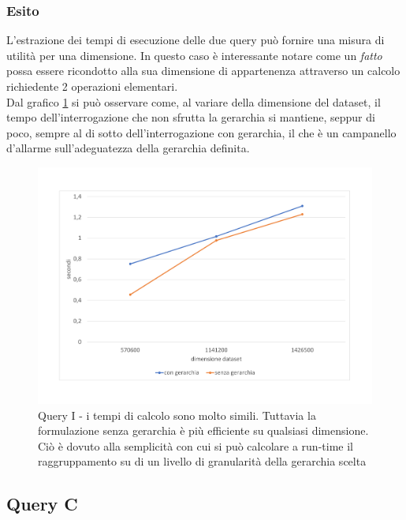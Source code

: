 \subsubsection{Esito}
L'estrazione dei tempi di esecuzione delle due query può fornire una misura di utilità per una dimensione. In questo caso è interessante notare come un \textit{fatto} possa essere ricondotto alla sua dimensione di appartenenza attraverso un calcolo richiedente 2 operazioni elementari.\\
\noindent{}Dal grafico \ref{fig:queryi} si può osservare come, al variare della dimensione del dataset, il tempo dell'interrogazione che non sfrutta la gerarchia si mantiene, seppur di poco, sempre al di sotto dell'interrogazione con gerarchia, il che è un campanello d'allarme sull'adeguatezza della gerarchia definita.
\begin{figure}
	\centering
	\includegraphics[width=1.0\linewidth]{figures/query_I}
	\caption{Query I - i tempi di calcolo sono molto simili. Tuttavia la formulazione senza gerarchia è più efficiente su qualsiasi dimensione. Ciò è dovuto alla semplicità con cui si può calcolare a run-time il raggruppamento su di un livello di granularità della gerarchia scelta}
	\label{fig:queryi}
\end{figure}
\newpage
\subsection{Query C}
